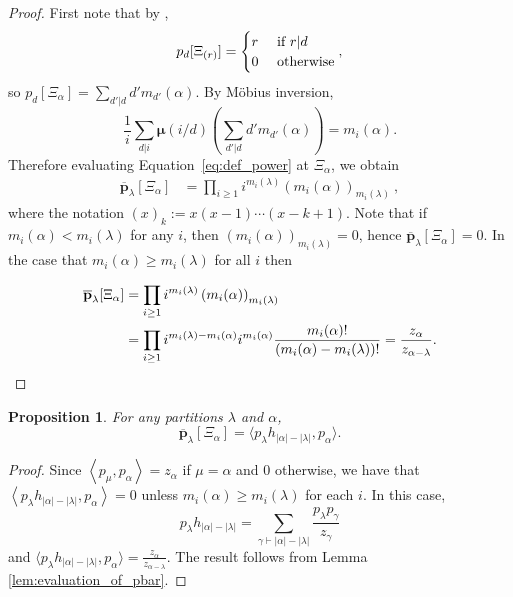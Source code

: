 \documentclass{amsart}
\newtheorem{prop}[lemma]{Proposition}
\theoremstyle{definition}
\begin{document}
\begin{proof}
	First note that by \cite[Lemma 5.10.1]{lascoux},
	\[p_d[\Xi_{(r)}]=\begin{cases}r & \hbox{ if }r|d\\0&\hbox{ otherwise}\end{cases},\]
	so $p_d[\Xi_\alpha]=\sum_{d'|d}d'm_{d'}(\alpha)$.
	By M\"obius inversion,
	\[\frac{1}{i}\sum_{d|i}{\boldsymbol \mu}(i/d)\left(\sum_{d'|d}d'm_{d'}(\alpha)\right)=m_i(\alpha).\]
	Therefore evaluating Equation~\eqref{eq:def_power} at $\Xi_\alpha$, we obtain
	\begin{align*}
		\overline{\mathbf p}_\lambda[\Xi_\alpha]&=\prod_{i\ge 1} i^{m_i(\lambda)} \left(m_i(\alpha)\right)_{m_i(\lambda)}~,
	\end{align*}
    where the notation $(x)_k := x(x-1)\cdots (x-k+1)$.
	Note that if $m_i(\alpha)<m_i(\lambda)$ for any
	$i$, then $\left(m_i(\alpha)\right)_{m_i(\lambda)}=0$, hence $\overline{\mathbf p}_\lambda[\Xi_\alpha]=0$.
	In the case that $m_i(\alpha)\geq m_i(\lambda)$ for all $i$ then

	\begin{align*}
		\overline{\mathbf p}_\lambda[\Xi_\alpha]&=\prod_{i\ge 1} i^{m_i(\lambda)} \left(m_i(\alpha)\right)_{m_i(\lambda)}\\
												&=\prod_{i\ge 1} i^{m_i(\lambda)-m_i(\alpha)}i^{m_i(\alpha)} \frac{m_i(\alpha)!}{(m_i(\alpha)-m_i(\lambda))!}
												=\frac{z_\alpha}{z_{\alpha-\lambda}}.\qedhere
	\end{align*}
\end{proof}

\begin{prop}\label{prop:evaluation_of_pbar}
	For any partitions $\lambda$ and $\alpha$,
	\[\overline{\mathbf p}_\lambda[\Xi_\alpha]=\langle p_\lambda h_{|\alpha|-|\lambda|},p_\alpha\rangle.\]
\end{prop}

\begin{proof}
    Since $\left< p_\mu, p_\alpha \right>=z_\alpha$ if $\mu=\alpha$ and $0$ otherwise, we have that
    $\left< p_\lambda h_{|\alpha|-|\lambda|}, p_\alpha\right>=0$ unless $m_i(\alpha)\geq m_i(\lambda)$
    for each $i$.
    In this case,
\[p_\lambda h_{|\alpha|-|\lambda|} = \sum_{\gamma \vdash |\alpha|-|\lambda|} \frac{p_\lambda p_\gamma}{z_\gamma}\]
    and $\langle p_\lambda h_{|\alpha|-|\lambda|},p_\alpha\rangle = \frac{z_\alpha}{z_{\alpha-\lambda}}$.
    The result follows from Lemma \ref{lem:evaluation_of_pbar}.
\end{proof}
\end{document}
